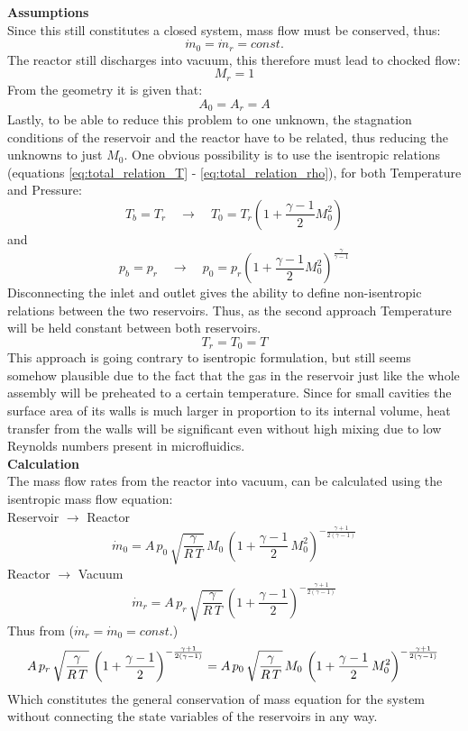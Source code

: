 \textbf{Assumptions}\\
Since this still constitutes a closed system, mass flow must be conserved, thus:
$$
	\dot{m}_0 = \dot{m}_r = const.
$$
The reactor still discharges into vacuum, this therefore must lead to chocked flow:
$$
	M_r = 1
$$
From the geometry it is given that:
$$
	A_0 = A_r = A
$$
Lastly, to be able to reduce this problem to one unknown, the stagnation conditions of the reservoir and the reactor have to be related, thus reducing the unknowns to just $M_0$.
One obvious possibility is to use the isentropic relations (equations \eqref{eq:total_relation_T} - \eqref{eq:total_relation_rho}), for both Temperature and Pressure:
$$
	T_b = T_r
	\quad \to \quad
	T_0 = T_r \left(1 + \frac{\gamma - 1}{2}M_0^2 \right)
$$
and
$$
	p_b = p_r
	\quad \to \quad
	p_0 = p_r \left(1 + \frac{\gamma - 1}{2}M_0^2 \right)^{\frac{\gamma}{\gamma - 1}}
$$
Disconnecting the inlet and outlet gives the ability to define non-isentropic relations between the two reservoirs.
Thus, as the second approach Temperature will be held constant between both reservoirs. 
$$
	T_r = T_0 = T
$$
This approach is going contrary to isentropic formulation, but still seems somehow plausible due to the fact that the gas in the reservoir just like the whole assembly will be preheated to a certain temperature.
Since for small cavities the surface area of its walls is much larger in proportion to its internal volume, heat transfer from the walls will be significant even without high mixing due to low Reynolds numbers present in microfluidics.\\
\textbf{Calculation}\\
The mass flow rates from the reactor into vacuum, can be calculated using the isentropic mass flow equation:\\
Reservoir $\to$ Reactor
$$
	\dot{m}_0 = A\, p_0\, \sqrt{\frac{\gamma}{R\,T}}\, M_0\,\left(1+\frac{\gamma-1}{2}\,M_0^2\right)^{-\frac{\gamma+1}{2(\gamma-1)}}
$$
Reactor $\to$ Vacuum
$$
	\dot{m}_r = A\, p_r\, \sqrt{\frac{\gamma}{R\,T}}\,\left(1+\frac{\gamma-1}{2}\right)^{-\frac{\gamma+1}{2(\gamma-1)}}
$$
Thus from ($\dot{m}_r = \dot{m}_0 = const.$)
$$
	A\, p_r\, \sqrt{\frac{\gamma}{R\,T}}\,\left(1+\frac{\gamma-1}{2}\right)^{-\frac{\gamma+1}{2(\gamma-1)}}
	=  A\, p_0\, \sqrt{\frac{\gamma}{R\,T}}\, M_0\,\left(1+\frac{\gamma-1}{2}\,M_0^2\right)^{-\frac{\gamma+1}{2(\gamma-1)}}\\\\
$$
Which constitutes the general conservation of mass equation for the system without connecting the state variables of the reservoirs in any way.
